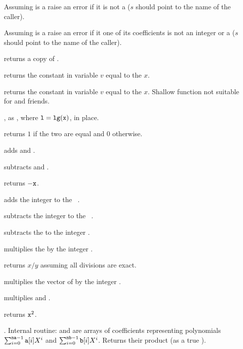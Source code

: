 
 Assuming  is a 
raise an error if it is not a  ($s$ should point to the name of the
caller).

 Assuming  is a 
raise an error if it one of its coefficients is not an integer or a 
($s$ should point to the name of the caller).

 returns a copy of .

 returns the constant  in variable
$v$ equal to the  $x$.

 returns the constant  in
variable $v$ equal to the  $x$. Shallow function not suitable for
 and friends.

, as , where
${\tt l} = {\tt lg(x)}$, in place.

 returns $1$ if the two  are equal
and $0$ otherwise.

 adds  and .

 subtracts  and .

 returns $-{\tt x}$.

 adds the integer  to the
~.

 subtracts the integer  to the
~.

 subtracts the   to the
integer .

 multiplies the   by the integer .

 returns $x/y$ assuming all divisions
are exact.

 multiplies the vector of  
by the integer .

 multiplies  and .

 returns ${\tt x}^2$.

. Internal routine:
 and  are arrays of coefficients representing polynomials
$\sum_{i = 0}^{{\tt na-1}} {\tt a}[i] X^i$ and
$\sum_{i = 0}^{{\tt nb-1}} {\tt b}[i] X^i$. Returns their product (as a true
).

